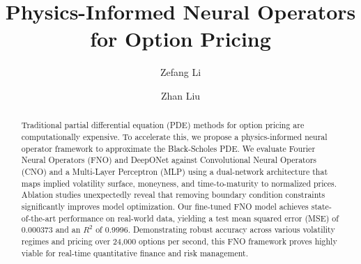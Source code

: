 \documentclass[a4paper,fleqn]{cas-sc}
\begin{document}
\let\WriteBookmarks\relax
\def\floatpagepagefraction{1}
\def\textpagefraction{.001}

\shorttitle{}    

\shortauthors{}  

\title [mode = title]{Physics-Informed Neural Operators for Option Pricing}  



%

\author[1]{Zefang Li}%


\author[1]{Zhan Liu}%


\begin{abstract}
Traditional partial differential equation (PDE) methods for option pricing are computationally expensive. To accelerate this, we propose a physics-informed neural operator framework to approximate the Black-Scholes PDE. We evaluate Fourier Neural Operators (FNO) and DeepONet against Convolutional Neural Operators (CNO) and a Multi-Layer Perceptron (MLP) using a dual-network architecture that maps implied volatility surface, moneyness, and time-to-maturity to normalized prices. Ablation studies unexpectedly reveal that removing boundary condition constraints significantly improves model optimization. Our fine-tuned FNO model achieves state-of-the-art performance on real-world data, yielding a test mean squared error (MSE) of 0.000373 and an $R^2$ of 0.9996. Demonstrating robust accuracy across various volatility regimes and pricing over 24,000 options per second, this FNO framework proves highly viable for real-time quantitative finance and risk management.
\end{abstract}
\end{document}
